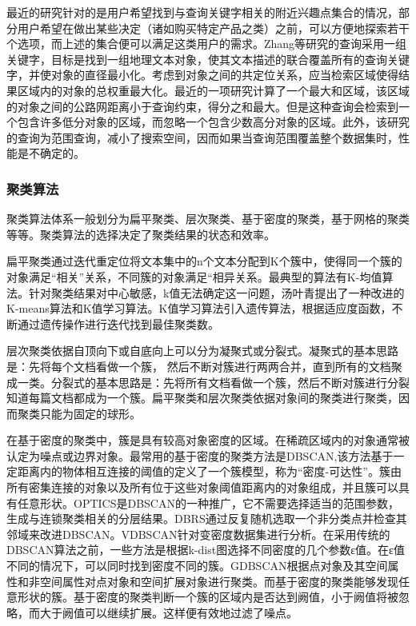 最近的研究针对的是用户希望找到与查询关键字相关的附近兴趣点集合的情况，部分用户希望在做出某些决定（诸如购买特定产品之类）之前，可以方便地探索若干个选项，而上述的集合便可以满足这类用户的需求。Zhang等研究的查询采用一组关键字，目标是找到一组地理文本对象，使其文本描述的联合覆盖所有的查询关键字，并使对象的直径最小化。考虑到对象之间的共定位关系，应当检索区域使得结果区域内的对象的总权重最大化。最近的一项研究计算了一个最大和区域，该区域的对象之间的公路网距离小于查询约束，得分之和最大。但是这种查询会检索到一个包含许多低分对象的区域，而忽略一个包含少数高分对象的区域。此外，该研究的查询为范围查询，减小了搜索空间，因而如果当查询范围覆盖整个数据集时，性能是不确定的。

\subsubsection{聚类算法}
聚类算法体系一般划分为扁平聚类、层次聚类、基于密度的聚类，基于网格的聚类等等。聚类算法的选择决定了聚类结果的状态和效率。

扁平聚类通过迭代重定位将文本集中的n个文本分配到K个簇中，使得同一个簇的对象满足“相关”关系，不同簇的对象满足“相异关系。最典型的算法有K-均值算法。针对聚类结果对中心敏感，k值无法确定这一问题，汤叶青提出了一种改进的K-means算法和K值学习算法。K值学习算法引入遗传算法，根据适应度函数，不断通过遗传操作进行迭代找到最佳聚类数。

层次聚类依据自顶向下或自底向上可以分为凝聚式或分裂式。凝聚式的基本思路是：先将每个文档看做一个簇， 然后不断对簇进行两两合并，直到所有的文档聚成一类。分裂式的基本思路是：先将所有文档看做一个簇，然后不断对簇进行分裂知道每篇文档都成为一个簇。扁平聚类和层次聚类依据对象间的聚类进行聚类，因而聚类只能为固定的球形。

在基于密度的聚类中，簇是具有较高对象密度的区域。在稀疏区域内的对象通常被认定为噪点或边界对象。最常用的基于密度的聚类方法是DBSCAN,该方法基于一定距离内的物体相互连接的阈值的定义了一个簇模型，称为“密度-可达性”。簇由所有密集连接的对象以及所有位于这些对象阈值距离内的对象组成，并且簇可以具有任意形状。OPTICS是DBSCAN的一种推广，它不需要选择适当的范围参数，生成与连锁聚类相关的分层结果。DBRS通过反复随机选取一个非分类点并检查其邻域来改进DBSCAN。VDBSCAN针对变密度数据集进行分析。在采用传统的DBSCAN算法之前，一些方法是根据k-dist图选择不同密度的几个参数ε值。在ε值不同的情况下，可以同时找到密度不同的簇。GDBSCAN根据点对象及其空间属性和非空间属性对点对象和空间扩展对象进行聚类。而基于密度的聚类能够发现任意形状的簇。基于密度的聚类判断一个簇的区域内是否达到阙值，小于阙值将被忽略，而大于阙值可以继续扩展。这样便有效地过滤了噪点。
